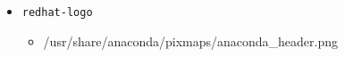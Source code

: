 \begin{itemize}
\item \texttt{redhat-logo}
\begin{itemize}
\item /usr/share/anaconda/pixmaps/anaconda\_header.png
\end{itemize}
\end{itemize}
